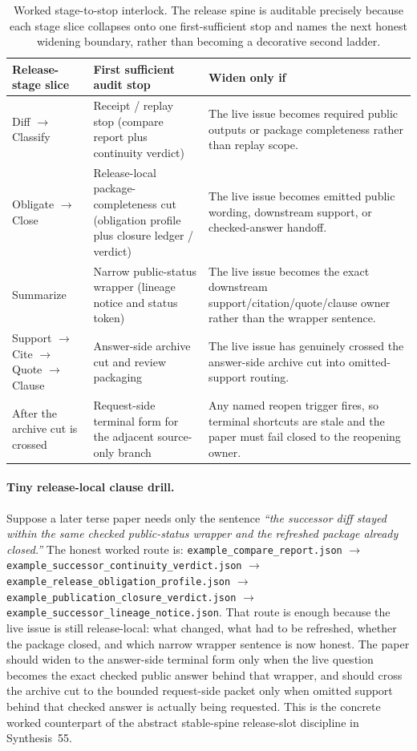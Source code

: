 \documentclass[11pt]{article}
\begin{document}
\begin{table}[t]
\centering
\small
\begin{tabularx}{\linewidth}{@{}Y Y Y@{}}
\toprule
Release-stage slice & First sufficient audit stop & Widen only if \\
\midrule
Diff $\to$ Classify & Receipt / replay stop (compare report plus continuity verdict) & The live issue becomes required public outputs or package completeness rather than replay scope. \\
Obligate $\to$ Close & Release-local package-completeness cut (obligation profile plus closure ledger / verdict) & The live issue becomes emitted public wording, downstream support, or checked-answer handoff. \\
Summarize & Narrow public-status wrapper (lineage notice and status token) & The live issue becomes the exact downstream support/citation/quote/clause owner rather than the wrapper sentence. \\
Support $\to$ Cite $\to$ Quote $\to$ Clause & Answer-side archive cut and review packaging & The live issue has genuinely crossed the answer-side archive cut into omitted-support routing. \\
After the archive cut is crossed & Request-side terminal form for the adjacent source-only branch & Any named reopen trigger fires, so terminal shortcuts are stale and the paper must fail closed to the reopening owner. \\
\bottomrule
\end{tabularx}
\caption{Worked stage-to-stop interlock. The release spine is auditable precisely because each stage slice collapses onto one first-sufficient stop and names the next honest widening boundary, rather than becoming a decorative second ladder.}
\label{tab:workedexample-stage-stop-interlock}
\end{table}

\paragraph{Tiny release-local clause drill.}
Suppose a later terse paper needs only the sentence 
\emph{``the successor diff stayed within the same checked public-status wrapper and the refreshed package already closed.''}
The honest worked route is:
\nolinkurl{example_compare_report.json}
$\to$
\texttt{example\_successor\_continuity\_verdict.json}
$\to$
\texttt{example\_release\_obligation\_profile.json}
$\to$
\texttt{example\_publication\_closure\_verdict.json}
$\to$
\texttt{example\_successor\_lineage\_notice.json}.
That route is enough because the live issue is still release-local: what changed, what had to be refreshed, whether the package closed, and which narrow wrapper sentence is now honest. The paper should widen to the answer-side terminal form only when the live question becomes the exact checked public answer behind that wrapper, and should cross the archive cut to the bounded request-side packet only when omitted support behind that checked answer is actually being requested. This is the concrete worked counterpart of the abstract stable-spine release-slot discipline in Synthesis~55.\cite{series:releasespine,series:releaseclosure,series:statusenvelopes,series:seriesspines,series:pairedterminalcutoverrules}
\end{document}
